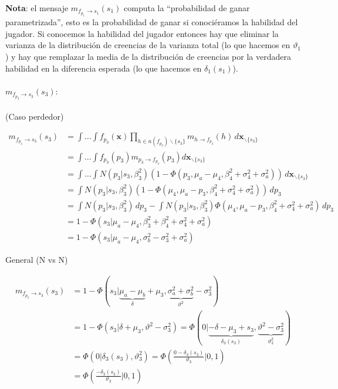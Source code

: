 \documentclass[11pt,twoside, spanish]{report} %
\begin{document}
\textbf{Nota}: el mensaje $m_{f_{p_1} \rightarrow s_1}(s_1)$ computa la ``probabilidad de ganar parametrizada'', esto es la probabilidad de ganar si conoci\'eramos la habilidad del jugador. Si conocemos la habilidad del jugador entonces hay que eliminar la varianza de la distribuci\'on de creencias de la varianza total (lo que hacemos en $\vartheta_1$) y hay que remplazar la media de la distribuci\'on de creencias por la verdadera habilidad en la diferencia esperada (lo que hacemos en $\delta_1(s_1)$).


\paragraph{$m_{f_{p_3} \rightarrow s_3}(s_3):$}(Caso perdedor)

\begin{equation}
	\begin{split}
		m_{f_{p_3} \rightarrow s_3}(s_3) & = \int \dots \int f_{p_3}(\textbf{x}) \prod_{h \in n(f_{p_3}) \backslash \{s_3\} } m_{h \rightarrow f_{p_3}}(h) \, d\textbf{x}_{\backslash \{s_3\} }  \\
		&= \int \dots \int f_{p_3}(p_3)m_{p_3 \rightarrow f_{p_3}}(p_3) d\textbf{x}_{\backslash \{s_3\} }  \\
		&= \int \dots \int N(p_3| s_3, \beta_3^2) (1 - \Phi(p_3, \mu_a  - \mu_4, \beta_4^2 + \sigma_4^2 + \sigma_a^2)) \, d\textbf{x}_{\backslash \{s_3\} }\\
		& = \int N(p_3| s_3, \beta_3^2) (1 - \Phi(\mu_4, \mu_a  - p_3, \beta_4^2 + \sigma_4^2 + \sigma_a^2)) \, dp_3 \\
		&=\int N(p_3| s_3, \beta_3^2) \, dp_3 -  \int N(p_3| s_3, \beta_3^2)  \Phi(\mu_4, \mu_a  - p_3, \beta_4^2 + \sigma_4^2 + \sigma_a^2) \, dp_3 \\
		&=1 - \Phi\left(s_3| \mu_a-  \mu_4, \beta_3^2 +\beta_4^2 + \sigma_4^2 + \sigma_a^2 \right)\\
		&=1 - \Phi\left(s_3| \mu_a-  \mu_4, \sigma_b^2-\sigma_3^2 + \sigma_a^2 \right)
	\end{split}
\end{equation}

General (N vs N)

\begin{equation}
	\begin{split}
		m_{f_{p_3} \rightarrow s_3}(s_3) & = 1 - \Phi(s_3| \underbrace{\mu_a-\mu_b}_{\delta}+\mu_3, \underbrace{\sigma_a^2 + \sigma_b^2}_{\vartheta^2} - \sigma_3^2 ) \\
		& = 1 - \Phi(s_3| \delta+\mu_3, \vartheta^2- \sigma_3^2 ) = \Phi(0| \underbrace{-\delta-\mu_3+s_3}_{\delta_3(s_3)}, \underbrace{\vartheta^2- \sigma_3^2}_{\vartheta_3^2}) \\
		& = \Phi(0|\delta_3(s_3),\vartheta_3^2)  = \Phi\left(\frac{0-\delta_3(s_3)}{\vartheta_3}|0,1\right) \\
		& = \Phi\left(\frac{-\delta_3(s_3)}{\vartheta_3}|0,1\right)
	\end{split}
\end{equation}
\end{document}
